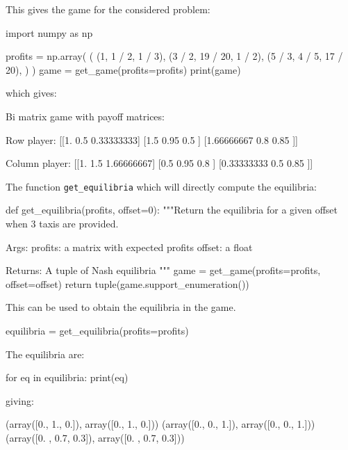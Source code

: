 This gives the game for the considered problem:

\begin{pyin}
import numpy as np

profits = np.array(
    (
        (1, 1 / 2, 1 / 3),
        (3 / 2, 19 / 20, 1 / 2),
        (5 / 3, 4 / 5, 17 / 20),
    )
)
game = get_game(profits=profits)
print(game)
\end{pyin}

which gives:

\begin{pyout}
Bi matrix game with payoff matrices:

Row player:
[[1.         0.5        0.33333333]
 [1.5        0.95       0.5       ]
 [1.66666667 0.8        0.85      ]]

Column player:
[[1.         1.5        1.66666667]
 [0.5        0.95       0.8       ]
 [0.33333333 0.5        0.85      ]]
\end{pyout}

The function \texttt{get_equilibria} which will directly compute the
equilibria:

\begin{pyin}
def get_equilibria(profits, offset=0):
    """Return the equilibria for a given offset when 3 taxis
    are provided.

    Args:
        profits: a matrix with expected profits
        offset: a float

    Returns:
        A tuple of Nash equilibria
    """
    game = get_game(profits=profits, offset=offset)
    return tuple(game.support_enumeration())
\end{pyin}

This can be used to obtain the equilibria in the game.

\begin{pyin}
equilibria = get_equilibria(profits=profits)
\end{pyin}

The equilibria are:

\begin{pyin}
for eq in equilibria:
    print(eq)
\end{pyin}

giving:

\begin{pyout}
(array([0., 1., 0.]), array([0., 1., 0.]))
(array([0., 0., 1.]), array([0., 0., 1.]))
(array([0. , 0.7, 0.3]), array([0. , 0.7, 0.3]))
\end{pyout}

